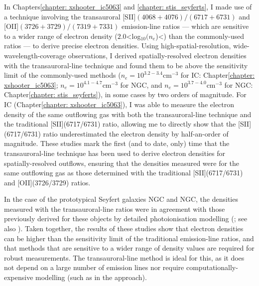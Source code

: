 In Chapters\;\ref{chapter: xshooter_ic5063} and \ref{chapter: stis_seyferts}, I made use of a technique involving the transauroral [SII]$(4068+4076)/(6717+6731)$ and [OII]$(3726+3729)/(7319+7331)$ emission-line ratios \citep{Holt2011, Rose2018, Santoro2020, Spence2018, Davies2020, Speranza2022, Speranza2024} --- which are sensitive to a wider range of electron density ($2.0$\;\textless\;log$_\mathrm{10}(n_e$\;[cm$^{-3}$])\;\textless{}) than the commonly-used ratios --- to derive precise electron densities. Using high-spatial-resolution, wide-wavelength-coverage observations, I derived spatially-resolved electron densities with the transauroral-line technique and found them to be above the sensitivity limit of the commonly-used methods ($n_e=10^{3.2-3.4}$\;cm$^{-3}$ for IC: Chapter\;\ref{chapter: xshooter_ic5063}; $n_e=10^{4.1-4.7}$\;cm$^{-3}$ for NGC, and $n_e=10^{3.7-4.0}$\;cm$^{-3}$ for NGC: Chapter\;\ref{chapter: stis_seyferts}), in some cases by two orders of magnitude. For IC (Chapter\;\ref{chapter: xshooter_ic5063}), I was able to measure the electron density of the same outflowing gas with both the transauroral-line technique and the traditional [SII](6717/6731) ratio, allowing me to directly show that the [SII](6717/6731) ratio underestimated the electron density by half-an-order of magnitude. These studies mark the first (and to date, only) time that the transauroral-line technique has been used to derive electron densities for spatially-resolved outflows, ensuring that the densities measured were for the same outflowing gas as those determined with the traditional [SII](6717/6731) and [OII](3726/3729) ratios.

\newpage

In the case of the prototypical Seyfert galaxies NGC and NGC, the densities measured with the transauroral-line ratios were in agreement with those previously derived for these objects by detailed photoionisation modelling (\citealt{Revalski2021}; see also \citealt{Revalski2022}). Taken together, the results of these studies show that electron densities can be higher than the sensitivity limit of the traditional emission-line ratios, and that methods that are sensitive to a wider range of density values are required for robust measurements. The transauroral-line method is ideal for this, as it does not depend on a large number of emission lines nor require computationally-expensive modelling (such as in the \citealt{Revalski2021} approach).

